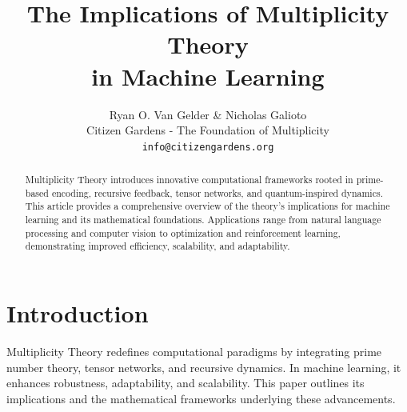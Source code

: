 \documentclass{article}
\title{The Implications of Multiplicity Theory \\ in Machine Learning}
\author{Ryan O. Van Gelder \& Nicholas Galioto\\
Citizen Gardens - The Foundation of Multiplicity \\
\texttt{info@citizengardens.org}}
\theoremstyle{plain}
\begin{document}
\maketitle

\begin{abstract}
Multiplicity Theory introduces innovative computational frameworks rooted in prime-based encoding, recursive feedback, tensor networks, and quantum-inspired dynamics. This article provides a comprehensive overview of the theory's implications for machine learning and its mathematical foundations. Applications range from natural language processing and computer vision to optimization and reinforcement learning, demonstrating improved efficiency, scalability, and adaptability.
\end{abstract}

\section{Introduction}
Multiplicity Theory redefines computational paradigms by integrating prime number theory, tensor networks, and recursive dynamics. In machine learning, it enhances robustness, adaptability, and scalability. This paper outlines its implications and the mathematical frameworks underlying these advancements.




\nocite{*}


\end{document}
